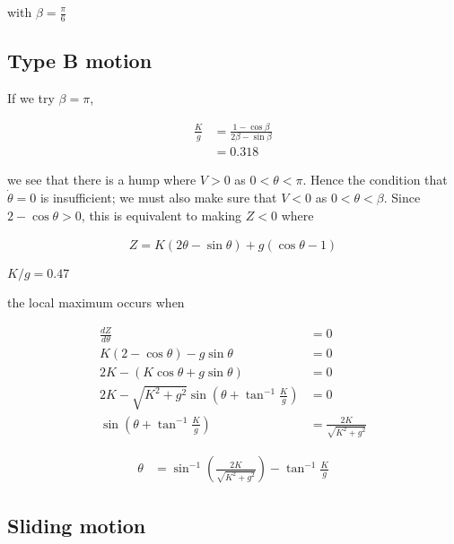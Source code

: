 \documentclass{article}
\begin{document}
with $\beta = \frac{\pi}{6}$

\subsection{Type B motion}

If we try $\beta = \pi$,

\begin{align*}
\frac{K}{g} &= \frac{1 - \cos\beta}{2\beta - \sin\beta} \\
&= 0.318
\end{align*}

we see that there is a hump where $V > 0$ as $0 < \theta < \pi$. Hence the condition that $\dot\theta = 0$ is insufficient; we must also make sure that $V < 0$ as $0 < \theta < \beta$. Since $2 - \cos\theta > 0$, this is equivalent to making $Z < 0$ where

\begin{align*}
Z = K(2\theta - \sin\theta)+ g(\cos\theta - 1)
\end{align*}

$K/g = 0.47$

the local maximum occurs when

\begin{align*}
\frac{dZ}{d\theta} &= 0 \\
K(2 - \cos\theta) - g\sin\theta &= 0 \\
2K - (K\cos\theta + g\sin\theta) &= 0 \\
2K - \sqrt{K^2 + g^2}\sin(\theta + \tan^{-1}\frac{K}{g}) &= 0 \\
\sin(\theta + \tan^{-1}\frac{K}{g}) &= \frac{2K}{\sqrt{K^2 + g^2}}
\end{align*}

\begin{align*}
\theta &= \sin^{-1}(\frac{2K}{\sqrt{K^2 + g^2}}) - \tan^{-1}\frac{K}{g}
\end{align*}

\subsection{Sliding motion}
\end{document}
